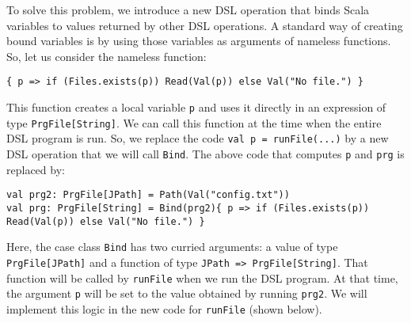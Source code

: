 To solve this problem, we introduce a new DSL operation that binds
Scala variables to values returned by other DSL operations. A standard
way of creating bound variables is by using
those variables as arguments of nameless functions. So, let us consider
the nameless function:
\begin{lstlisting}
{ p => if (Files.exists(p)) Read(Val(p)) else Val("No file.") }
\end{lstlisting}
This function creates a local variable \lstinline!p!
and uses it directly in an expression of type \lstinline!PrgFile[String]!.
We can call this function at the time when the entire DSL program
is run. So, we replace the code \lstinline!val p = runFile(...)!
by a new DSL operation that we will call \lstinline!Bind!.
The above code that computes \lstinline!p!
and \lstinline!prg! is
replaced by:
\begin{lstlisting}
val prg2: PrgFile[JPath] = Path(Val("config.txt"))
val prg: PrgFile[String] = Bind(prg2){ p => if (Files.exists(p)) Read(Val(p)) else Val("No file.") }
\end{lstlisting}
Here, the case class \lstinline!Bind!
has two curried arguments: a value of type \lstinline!PrgFile[JPath]!
and a function of type \lstinline!JPath => PrgFile[String]!.
That function will be called by \lstinline!runFile!
when we run the DSL program. At that time, the argument \lstinline!p!
will be set to the value obtained by running \lstinline!prg2!.
We will implement this logic in the new code for \lstinline!runFile!
(shown below).

